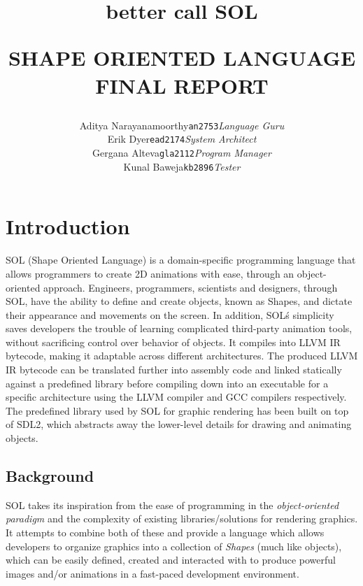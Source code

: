 \documentclass[letterpaper,12pt]{report}
\begin{document}
\title{{\small better call} {\Huge \textbf{SOL}}\\
    \begin{center}{SHAPE ORIENTED LANGUAGE FINAL REPORT}\end{center}
}

\author{
\begin{tabular}{ lc lc lc }
Aditya Narayanamoorthy & \texttt{an2753}  & \textit{Language Guru}    \\
Erik Dyer              & \texttt{ead2174} & \textit{System Architect} \\
Gergana Alteva         & \texttt{gla2112} & \textit{Program Manager}  \\
Kunal Baweja           & \texttt{kb2896}  & \textit{Tester}
\end{tabular}
}

\maketitle

\tableofcontents{}

\chapter{Introduction}
  SOL (Shape Oriented Language) is a domain-specific programming language that allows programmers to create 2D animations with ease, through an object-oriented approach. Engineers, programmers, scientists and designers, through SOL, have the ability to define and create objects, known as Shapes, and dictate their appearance and movements on the screen. In addition, SOL\'s simplicity saves developers the trouble of learning complicated third-party animation tools, without sacrificing control over behavior of objects. It compiles into LLVM IR bytecode, making it adaptable across different architectures. The produced LLVM IR bytecode can be translated further into assembly code and linked statically against a predefined library before compiling down into an executable for a specific architecture using the LLVM compiler and GCC compilers respectively. The predefined library used by SOL for graphic rendering has been built on top of SDL2, which abstracts away the lower-level details for drawing and animating objects.

  \section{Background}
  SOL takes its inspiration from the ease of programming in the \textit{object-oriented paradigm} and the complexity of existing libraries/solutions for rendering graphics. It attempts to combine both of these and provide a language which allows developers to organize graphics into a collection of \textit{Shapes} (much like objects), which can be easily defined, created and interacted with to produce powerful images and/or animations in a fast-paced development environment.\\
\end{document}
